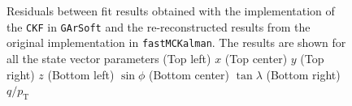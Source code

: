 \begin{figure}[t]
\begin{subfigure}{0.32\textwidth}
         \caption{}
         \label{fig:diff4_Integration}
     \end{subfigure}
        \caption[Residuals between fit results obtained with the implementation of the \texttt{CKF} in \texttt{GArSoft} and the re-reconstructed results from the original implementation in \texttt{fastMCKalman}.]{Residuals between fit results obtained with the implementation of the \texttt{CKF} in \texttt{GArSoft} and the re-reconstructed results from the original implementation in \texttt{fastMCKalman}. The results are shown for all the state vector parameters (Top left) $x$ (Top center) $y$ (Top right) $z$ (Bottom left) $\sin\phi$ (Bottom center) $\tan\lambda$ (Bottom right) $q/p_\text{T}$}
        \label{fig:diff_Integration}
\end{figure}

